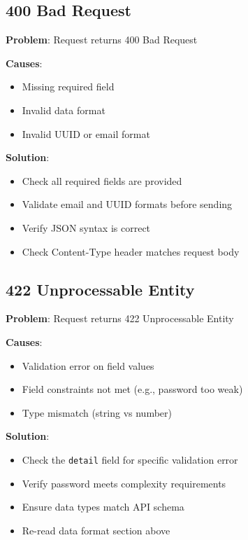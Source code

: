 \documentclass[12pt,a4paper,oneside]{article}
\begin{document}
\subsection{400 Bad Request}

\begin{tcolorbox}[colback=lightred, colframe=darkblue]
\textbf{Problem}: Request returns 400 Bad Request

\textbf{Causes}:
\begin{itemize}
    \item Missing required field
    \item Invalid data format
    \item Invalid UUID or email format
\end{itemize}

\textbf{Solution}:
\begin{itemize}
    \item Check all required fields are provided
    \item Validate email and UUID formats before sending
    \item Verify JSON syntax is correct
    \item Check Content-Type header matches request body
\end{itemize}
\end{tcolorbox}

\subsection{422 Unprocessable Entity}

\begin{tcolorbox}[colback=lightred, colframe=darkblue]
\textbf{Problem}: Request returns 422 Unprocessable Entity

\textbf{Causes}:
\begin{itemize}
    \item Validation error on field values
    \item Field constraints not met (e.g., password too weak)
    \item Type mismatch (string vs number)
\end{itemize}

\textbf{Solution}:
\begin{itemize}
    \item Check the \texttt{detail} field for specific validation error
    \item Verify password meets complexity requirements
    \item Ensure data types match API schema
    \item Re-read data format section above
\end{itemize}
\end{tcolorbox}
\end{document}
